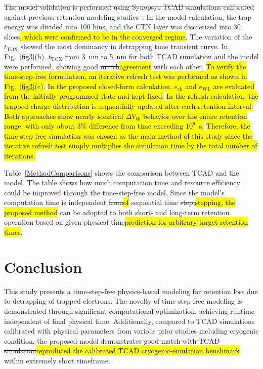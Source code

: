 \documentclass[journal,twoside,web]{ieeecolor}
\begin{document}
\sout{The model validation is performed using Synopsys TCAD simulations calibrated against previous retention modeling studies~\hbox{\cite{Han.TED2026, Jin.TED2025}}.}
In the model calculation, the trap energy was divided into 100 bins, and the CTN layer was discretized into 30 slices\hl{, which were confirmed to be in the converged regime}.
The variation of the $t_\text{TOX}$ showed the most dominancy in detrapping time transient curve.
In Fig.~\ref{fig3}(b), $t_\text{TOX}$ from 3~nm to 5~nm for both TCAD simulation and the model were performed, showing good \sout{match}\hl{agreement} with each other.
\hl{To verify the time-step-free formulation, an iterative refresh test was performed as shown in Fig.~\hbox{\ref{fig3}(c)}.}
\hl{In the proposed closed-form calculation, $e_\mathrm{ch}$ and $e_\mathrm{WL}$ are evaluated from the initially programmed state and kept fixed.}
\hl{In the refresh calculation, the trapped-charge distribution is sequentially updated after each retention interval.}
\hl{Both approaches show nearly identical $\Delta V_\text{th}$ behavior over the entire retention range, with only about 3\% difference from time exceeding $10^9$~s.}
\hl{Therefore, the time-step-free simulation was chosen as the main method of this study since the iterative refresh test simply multiplies the simulation time by the total number of iterations.}

Table~\ref{MethodComparisons} shows the comparison between TCAD and the model.
The table shows how much computation time and resource efficiency could be improved through the time-step-free model.
Since the model's computation time is independent \sout{from}\hl{of} sequential time \sout{step,}\hl{stepping, the proposed method} can be adopted to both short- and long-term retention \sout{operation based on given physical time}\hl{prediction for arbitrary target retention times}.

\section{Conclusion}
This study presents a time-step-free physics-based modeling for retention loss due to detrapping of trapped electrons. 
The novelty of time-step-free modeling is demonstrated through significant computational optimization, achieving runtime independent of final physical time.
Additionally, compared to TCAD simulations calibrated with physical parameters from various prior studies including cryogenic condition, the proposed model \sout{demonstrates good match with TCAD simulation}\hl{reproduced the calibrated TCAD cryogenic-emulation benchmark} within extremely short timeframe. 
\end{document}

